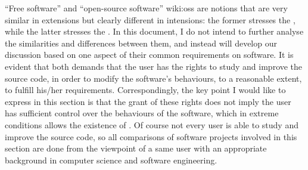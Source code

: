``Free software'' and ``open-source software''\cupercite%
{wiki:oss} are notions that are very similar in extensions but clearly
different in intensions: the former stresses the , while the latter stresses the
.
In this document, I do not intend to further analyse the similarities and
differences between them, and instead will develop our discussion based on
one aspect of their common requirements on software.  It is evident that both
demands that the user has the rights to study and improve the source code,
in order to modify the software's behaviours, to a reasonable extent, to
fulfill his/her requirements.  Correspondingly, the key point I would like
to express in this section is that the grant of these rights does not imply
the user has sufficient control over the behaviours of the software, which in
extreme conditions allows the existence of .  Of course not every user is able to study and improve the
source code, so all comparisons of software projects involved in this section
are done from the viewpoint of a same user with an appropriate background
in computer science and software engineering.

